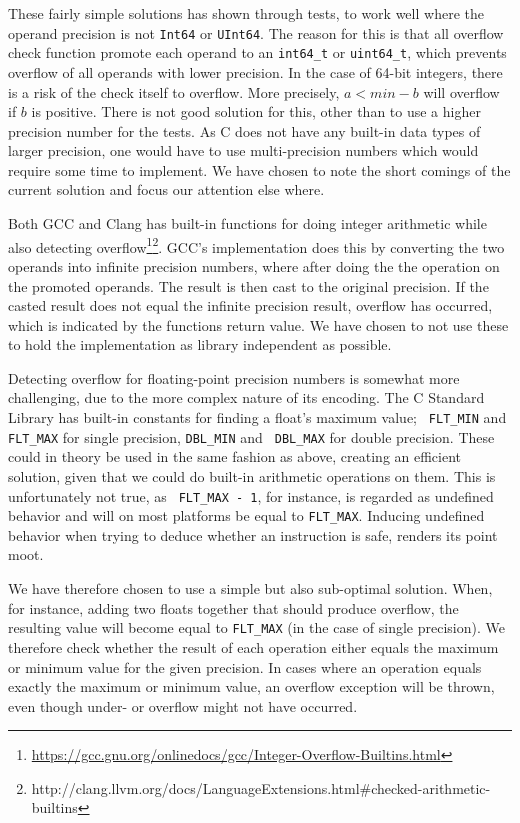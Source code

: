 These fairly simple solutions has shown through tests, to work well where the
operand precision is not {\tt Int64} or {\tt UInt64}. The reason for this is
that all overflow check function promote each operand to an {\tt int64\_t} or
{\tt uint64\_t}, which prevents overflow of all operands with lower
precision. In the case of 64-bit integers, there is a risk of the check itself
to overflow. More precisely, $a < min - b$ will overflow if $b$ is
positive. There is not good solution for this, other than to use a higher
precision number for the tests. As C does not have any built-in data types of
larger precision, one would have to use multi-precision numbers which would
require some time to implement. We have chosen to note the short comings of the
current solution and focus our attention else where.

Both GCC and Clang has built-in functions for doing integer arithmetic while
also detecting
overflow\footnote{\url{https://gcc.gnu.org/onlinedocs/gcc/Integer-Overflow-Builtins.html}}\footnote{http://clang.llvm.org/docs/LanguageExtensions.html\#checked-arithmetic-builtins}. GCC's
implementation does this by converting the two operands into infinite precision
numbers, where after doing the the operation on the promoted operands. The
result is then cast to the original precision. If the casted result does not
equal the infinite precision result, overflow has occurred, which is indicated
by the functions return value. We have chosen to not use these to hold the
implementation as library independent as possible.

Detecting overflow for floating-point precision numbers is somewhat more
challenging, due to the more complex nature of its encoding. The C Standard
Library has built-in constants for finding a float's maximum value; {\tt
  FLT\_MIN} and {\tt FLT\_MAX} for single precision, {\tt DBL\_MIN} and {\tt
  DBL\_MAX} for double precision. These could in theory be used in the same
fashion as above, creating an efficient solution, given that we could do
built-in arithmetic operations on them. This is unfortunately not true, as {\tt
  FLT\_MAX - 1}, for instance, is regarded as undefined behavior and will on
most platforms be equal to {\tt FLT\_MAX}. Inducing undefined behavior when
trying to deduce whether an instruction is safe, renders its point
moot.

We have therefore chosen to use a simple but also sub-optimal solution. When,
for instance, adding two floats together that should produce overflow, the
resulting value will become equal to {\tt FLT\_MAX} (in the case of single
precision). We therefore check whether the result of each operation either
equals the maximum or minimum value for the given precision. In cases where an
operation equals exactly the maximum or minimum value, an overflow exception
will be thrown, even though under- or overflow might not have occurred.


